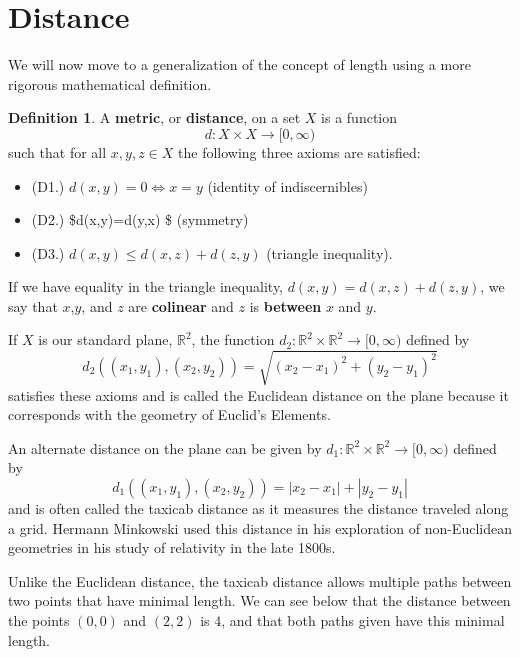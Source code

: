 \documentclass[
]{book}
\providecommand{\tightlist}{%
  \setlength{\itemsep}{0pt}\setlength{\parskip}{0pt}}
\theoremstyle{definition}
\newtheorem{definition}{Definition}[chapter]
\theoremstyle{definition}
\theoremstyle{definition}
\theoremstyle{definition}
\theoremstyle{remark}
\begin{document}
\hypertarget{distance}{%
\section{Distance}\label{distance}}

We will now move to a generalization of the concept of length using a more rigorous mathematical definition.

\begin{definition}
A \textbf{metric}, or \textbf{distance}, on a set \(X\) is a function
\[d: X\times X \rightarrow [0,\infty)\] such that for all \(x,y,z\in X\) the following three axioms are satisfied:

\begin{itemize}
\tightlist
\item
  (D1.) \(d(x,y)=0 \Leftrightarrow x=y\) (identity of indiscernibles)
\item
  (D2.) \$d(x,y)=d(y,x) \$ (symmetry)
\item
  (D3.) \(d(x,y) \leq d(x,z)+d(z,y)\) (triangle inequality).
\end{itemize}

If we have equality in the triangle inequality, \(d(x,y)=d(x,z)+d(z,y)\), we say that \(x\),\(y\), and \(z\) are \textbf{colinear} and \(z\) is \textbf{between} \(x\) and \(y\).
\end{definition}

If \(X\) is our standard plane, \(\mathbb{R}^2\), the function \(d_2:\mathbb{R}^2\times \mathbb{R}^2 \rightarrow [0,\infty)\) defined by
\[d_2\left( (x_1,y_1), (x_2,y_2)\right) = \sqrt{ (x_2-x_1)^2 + (y_2-y_1)^2}\] satisfies these axioms and is called the Euclidean distance on the plane because it corresponds with the geometry of Euclid's Elements.

An alternate distance on the plane can be given by \(d_1:\mathbb{R}^2 \times \mathbb{R}^2 \rightarrow [0,\infty)\) defined by \[d_1\left( (x_1,y_1), (x_2,y_2)\right) = |x_2-x_1| + |y_2-y_1|\] and is often called the taxicab distance as it measures the distance traveled along a grid. Hermann Minkowski used this distance in his exploration of non-Euclidean geometries in his study of relativity in the late 1800s.

Unlike the Euclidean distance, the taxicab distance allows multiple paths between two points that have minimal length. We can see below that the distance between the points \((0,0)\) and \((2,2)\) is \(4\), and that both paths given have this minimal length.
\end{document}
